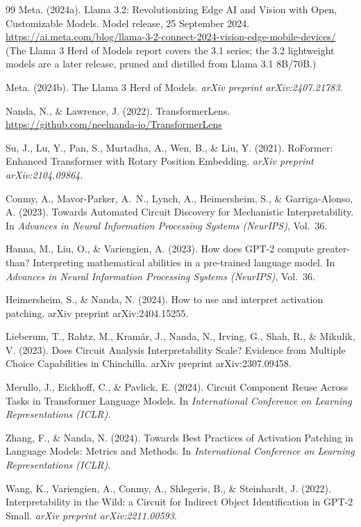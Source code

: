 \documentclass[11pt,a4paper]{article}
\begin{document}
\begin{thebibliography}{99}
Meta.
(2024a).
Llama 3.2: Revolutionizing Edge AI and Vision with Open, Customizable Models.
Model release, 25 September 2024.
\url{https://ai.meta.com/blog/llama-3-2-connect-2024-vision-edge-mobile-devices/}
(The Llama 3 Herd of Models report covers the 3.1 series; the 3.2 lightweight
models are a later release, pruned and distilled from Llama 3.1 8B/70B.)

Meta.
(2024b).
The Llama 3 Herd of Models.
\emph{arXiv preprint arXiv:2407.21783}.

Nanda, N., \& Lawrence, J.
(2022).
TransformerLens.
\url{https://github.com/neelnanda-io/TransformerLens}

Su, J., Lu, Y., Pan, S., Murtadha, A., Wen, B., \& Liu, Y.
(2021).
RoFormer: Enhanced Transformer with Rotary Position Embedding.
\emph{arXiv preprint arXiv:2104.09864}.

Conmy, A., Mavor-Parker, A.~N., Lynch, A., Heimersheim, S., \& Garriga-Alonso, A.
(2023). Towards Automated Circuit Discovery for Mechanistic Interpretability.
In \emph{Advances in Neural Information Processing Systems (NeurIPS)}, Vol.~36.

Hanna, M., Liu, O., \& Variengien, A. (2023). How does GPT-2 compute greater-than?
Interpreting mathematical abilities in a pre-trained language model.
In \emph{Advances in Neural Information Processing Systems (NeurIPS)}, Vol.~36.

Heimersheim, S., \& Nanda, N. (2024). How to use and interpret activation patching.
arXiv preprint arXiv:2404.15255.

Lieberum, T., Rahtz, M., Kram\'ar, J., Nanda, N., Irving, G., Shah, R., \&
Mikulik, V. (2023). Does Circuit Analysis Interpretability Scale? Evidence from
Multiple Choice Capabilities in Chinchilla. arXiv preprint arXiv:2307.09458.

Merullo, J., Eickhoff, C., \& Pavlick, E. (2024). Circuit Component Reuse Across
Tasks in Transformer Language Models. In \emph{International Conference on Learning
Representations (ICLR)}.

Zhang, F., \& Nanda, N. (2024). Towards Best Practices of Activation Patching in
Language Models: Metrics and Methods. In \emph{International Conference on Learning
Representations (ICLR)}.

Wang, K., Variengien, A., Conmy, A., Shlegeris, B., \& Steinhardt, J.
(2022).
Interpretability in the Wild: a Circuit for Indirect Object Identification in GPT-2
Small.
\emph{arXiv preprint arXiv:2211.00593}.

\end{thebibliography}
\end{document}
